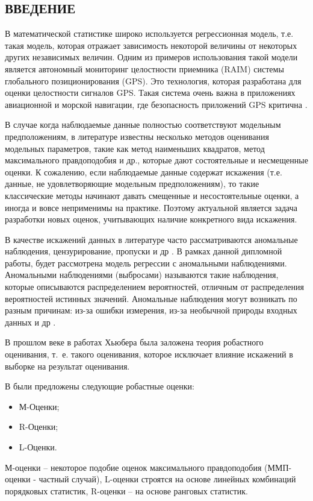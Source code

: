 \begin{center}
    \section*{ВВЕДЕНИЕ}
\end{center}
{}

В математической статистике широко используется регрессионная модель, т.е. такая модель, которая отражает зависимость некоторой величины от некоторых других независимых величин. 
Одним из примеров использования такой модели является автономный мониторинг целостности приемника (RAIM) системы глобального позиционирования (GPS). 
Это технология, которая разработана для оценки целостности сигналов GPS. 
Такая система очень важна в приложениях авиационной и морской навигации, где безопасность приложений GPS критична \cite{GPS_POSITIONING}.

В случае когда наблюдаемые данные полностью соответствуют модельным предположениям, в литературе известны несколько методов оценивания модельных параметров, такие как метод наименьших квадратов, метод максимального правдоподобия и др., которые дают состоятельные и несмещенные оценки. 
К сожалению, если наблюдаемые данные содержат искажения (т.е. данные, не удовлетворяющие модельным предположениям), то такие классические методы начинают давать смещенные и несостоятельные оценки, а иногда и вовсе неприменимы на практике. 
Поэтому актуальной является задача разработки новых оценок, учитывающих наличие конкретного вида искажения. 

В качестве искажений данных в литературе часто рассматриваются аномальные наблюдения, цензурирование, пропуски и др \cite{ComparisonRobust}. В рамках данной дипломной работы, будет рассмотрена модель регрессии с аномальными наблюдениями. 
Аномальными наблюдениями (выбросами) называются такие наблюдения, которые описываются распределением вероятностей, отличным от распределения вероятностей истинных значений.
Аномальные наблюдения могут возникать по разным причинам: из-за ошибки измерения, из-за необычной природы входных данных и др \cite{OLSforGrouping}.

В прошлом веке в работах Хьюбера была заложена теория робастного оценивания, т.~е. такого оценивания, которое исключает влияние искажений в выборке на результат оценивания.

В \cite{Huber} были предложены следующие робастные оценки:
\begin{itemize}
    \item М-Оценки;
    \item R-Оценки;
    \item L-Оценки.
\end{itemize}
М-оценки -- некоторое подобие оценок максимального правдоподобия (ММП-оценки - частный случай), L-оценки строятся на основе линейных комбинаций порядковых статистик, R-оценки -- на основе ранговых статистик.

